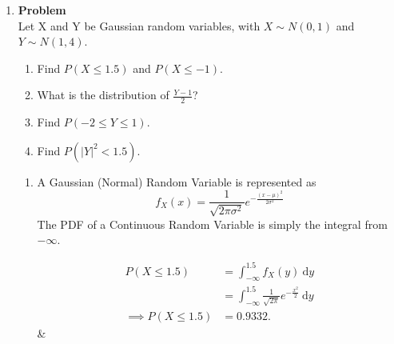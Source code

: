 \documentclass[12pt]{article}
\newenvironment{Ex}{\textbf{Problem}\vspace{.75em}\\}{}
\newcommand{\dd}[1]{\:\mathrm{d}{#1}}
\begin{document}
\begin{enumerate}
\begin{Ex}
\begin{solution}
\begin{enumerate}
\begin{equation}
          \label{eq:1b-sol-piecewise}
            \implies F_Z(z) &= \left\{
            \begin{aligned}
              &\frac{1}{6}\left(x + \frac{x^3}{3} +
                \frac{14}{3}\right) &\quad -2 < x < 1 \\
              &0 &\quad \text{otherwise}
            \end{aligned}\right.
        \end{equation}
       \end{enumerate}
    \end{solution}
  \end{Ex}
\item
  \begin{Ex}
    Let X and Y be Gaussian random variables, with $X \sim N(0,1)$ and
    $Y \sim N(1,4)$.
    \begin{enumerate}
    \item Find $P(X \le 1.5)$ and $P(X \le -1)$.
    \item What is the distribution of $\frac{Y-1}{2}$?
    \item Find $P(-2 \le Y \le 1)$.
    \item Find $P(|Y|^2 < 1.5)$.
    \end{enumerate}
    \begin{solution} \hfill
      \begin{enumerate}
      \item A Gaussian (Normal) Random Variable is represented as
        \begin{equation}
          \label{eq:2-gaussian}
          f_X(x) = \frac{1}{\sqrt{2\pi\sigma^2}}e^{-\frac{(x-\mu)^2}{2\sigma^2}}
        \end{equation}
        The PDF of a Continuous Random Variable is simply the integral
        from $-\infty$.
        \begin{multicols}{2}
          \begin{equation}
            \label{eq:2ai-sol}
            \begin{aligned}
              P(X\le 1.5) &= \int_{-\infty}^{1.5} f_X(y) \dd{y} \\
              &= \int_{-\infty}^{1.5} \frac{1}{\sqrt{2\pi}}e^{-\frac{x^2}{2}}
              \dd{y} \\
              \implies P(X \le 1.5 )&= 0.9332.
            \end{aligned}
          \end{equation} &
          \begin{equation}
            \label{eq:2aii-sol}

\end{equation}
\end{multicols}
\end{enumerate}
\end{solution}
\end{Ex}
\end{enumerate}
\end{document}
